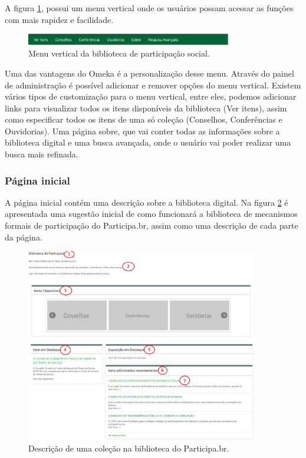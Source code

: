 A figura \ref{fig:vertical_prototipo}, possui um menu vertical onde os usuários possam acessar as funções com mais rapidez e facilidade.

\graphicspath{{figuras/prototipo/}}
\begin{figure}[H]
\centering
\includegraphics[width=0.8\textwidth]{barra-superior}
\caption{Menu vertical da biblioteca de participação social.}
\label{fig:vertical_prototipo}
\end{figure}

Uma das vantagens do Omeka é a personalização desse menu. Através do painel de administração é possível adicionar e remover opções do menu vertical. Existem vários tipos de customização para o menu vertical, entre eles, podemos adicionar links para visualizar todos os itens disponíveis da biblioteca (Ver itens), assim como especificar todos os itens de uma só coleção (Conselhos, Conferências e Ouvidorias). Uma página sobre, que vai conter todas as informações sobre a biblioteca digital e uma busca avançada, onde o usuário vai poder realizar uma busca mais refinada.

\subsubsection{Página inicial}

A página inicial contém uma descrição sobre a biblioteca digital. Na figura \ref{fig:inicial_prototipo} é apresentada uma sugestão inicial de como funcionará a biblioteca de mecanismos formais de participação do Participa.br, assim como uma descrição de cada parte da página.

\graphicspath{{figuras/prototipo/}}
\begin{figure}[H]
\centering
\includegraphics[width=0.9\textwidth]{pagina-inicial}
\caption{Descrição de uma coleção na biblioteca do Participa.br.}
\label{fig:inicial_prototipo}
\end{figure}


